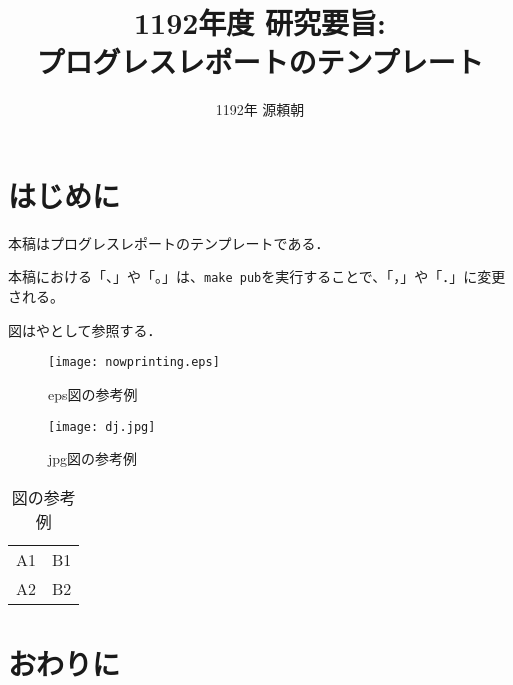 \documentclass[twocolumn]{preport}
\title{1192年度 研究要旨: \\
プログレスレポートのテンプレート}
\author{1192年 源頼朝}
\begin{document}
\pagestyle{empty}
\maketitle
\thispagestyle{empty}
\sloppy

\section{はじめに}

本稿はプログレスレポートのテンプレートである\cite{Sakai}．

本稿における「、」や「。」は、\verb|make pub|を実行することで、「，」や「．」に変更される。

図はやとして参照する．

\begin{figure}[tbh]
 \begin{center}
  \begin{minipage}{0.3\columnwidth}
   \texttt{[image: nowprinting.eps]}
   \caption{eps図の参考例}
  \end{minipage}
  \hspace{0.15\columnwidth}
  \begin{minipage}{0.3\columnwidth}
   \texttt{[image: dj.jpg]}
   \caption{jpg図の参考例}
  \end{minipage}
  \label{figure:nowprinting}
 \end{center}
\end{figure}

\begin{table}[tbh]
 \begin{center}
  \begin{tabular}{|l|r|} \hline
  A1 & B1 \\
  A2 & B2 \\ \hline
  \end{tabular}
  \caption{図の参考例}
  \label{table:sample}
 \end{center}
\end{table}

\section{おわりに}



\end{document}
